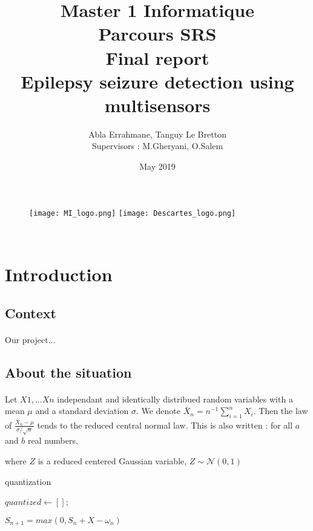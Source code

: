 \documentclass[11pt]{article}
\title{	\LARGE Master 1 Informatique \\
	Parcours SRS \\ 
	\vspace{20mm} 
\Huge	\textbf{Final report} \\ 
	\vspace{20mm} 
\Huge	\textbf{Epilepsy seizure detection using multisensors}
}
\author{Abla Errahmane, Tanguy Le Bretton \\ \vspace{5mm} Supervisors : M.Gheryani, O.Salem}
\date{May 2019}
\begin{document}
\begin{figure}[t]
	\texttt{[image: MI\_logo.png]}
	\texttt{[image: Descartes\_logo.png]}

\end{figure}

\maketitle

\newpage
~
\newpage
\tableofcontents
\newpage


\section{Introduction}
\subsection{Context}
\paragraph{}
Our project...

\subsection{About the situation}
\paragraph{}

Let $X1,...Xn$ independant and identically distribued random variables with a mean $\mu$ and a standard deviation $\sigma$. We denote $\bar{X}_n = n^{-1} \sum_{i=1}^{n}X_i$. Then the law of $\frac{\bar{X}_n- \mu}{\sigma / \sqrt{n}}$ tends to the reduced central normal law. This is also written : 
for all $a$ and $b$ real numbers, \newline

where $Z$ is a reduced centered Gaussian variable, $Z\sim \mathcal{N}(0,1)$

\begin{algorithm}
\SetAlgoLined
\DontPrintSemicolon
{}
\caption{quantization}
$quantized \gets []$;\;
\end{algorithm}
\; \newline
 \newline
$S_{n+1} = max(0,S_n+X-\omega_n)$
\end{document}
